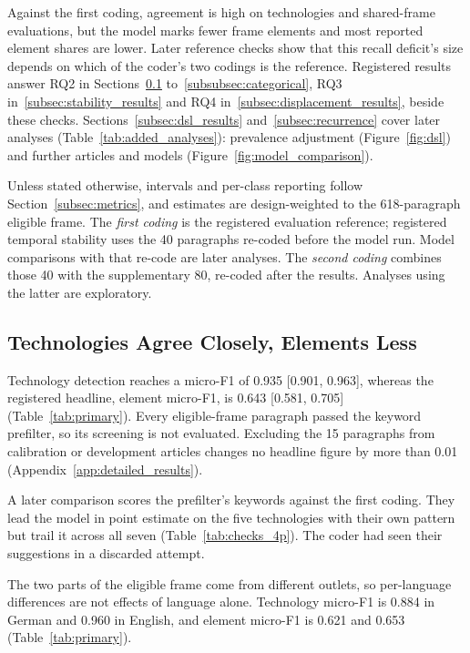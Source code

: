 Against the first coding, agreement is high on technologies and shared-frame evaluations, but the model marks fewer frame elements and most reported element shares are lower. Later reference checks show that this recall deficit's size depends on which of the coder's two codings is the reference. Registered results answer RQ2 in Sections~\ref{subsec:agreement} to~\ref{subsubsec:categorical}, RQ3 in~\ref{subsec:stability_results} and RQ4 in~\ref{subsec:displacement_results}, beside these checks. Sections~\ref{subsec:dsl_results} and~\ref{subsec:recurrence} cover later analyses (Table~\ref{tab:added_analyses}): prevalence adjustment (Figure~\ref{fig:dsl}) and further articles and models (Figure~\ref{fig:model_comparison}).

Unless stated otherwise, intervals and per-class reporting follow Section~\ref{subsec:metrics}, and estimates are design-weighted to the 618-paragraph eligible frame. The \emph{first coding} is the registered evaluation reference; registered temporal stability uses the 40 paragraphs re-coded before the model run. Model comparisons with that re-code are later analyses. The \emph{second coding} combines those 40 with the supplementary 80, re-coded after the results. Analyses using the latter are exploratory.

\subsection{Technologies Agree Closely, Elements Less}\label{subsec:agreement}

Technology detection reaches a micro-F1 of 0.935 [0.901, 0.963], whereas the registered headline, element micro-F1, is 0.643 [0.581, 0.705] (Table~\ref{tab:primary}). Every eligible-frame paragraph passed the keyword prefilter, so its screening is not evaluated. Excluding the 15 paragraphs from calibration or development articles changes no headline figure by more than 0.01 (Appendix~\ref{app:detailed_results}).



A later comparison scores the prefilter's keywords against the first coding. They lead the model in point estimate on the five technologies with their own pattern but trail it across all seven (Table~\ref{tab:checks_4p}). The coder had seen their suggestions in a discarded attempt.

\label{subsec:run_record}\label{subsec:sensitivity}%
The two parts of the eligible frame come from different outlets, so per-language differences are not effects of language alone. Technology micro-F1 is 0.884 in German and 0.960 in English, and element micro-F1 is 0.621 and 0.653 (Table~\ref{tab:primary}).

